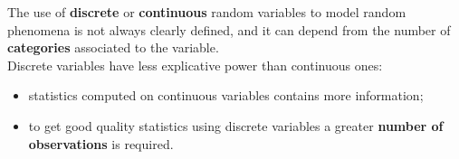 \begin{frame}
  \vspace*{.5cm}
  The use of \textbf{discrete} or \textbf{continuous} random variables to model random phenomena is not always clearly defined, and it can depend from the number of \textbf{categories} associated to the variable.\\
  \vspace*{.75cm}
  Discrete variables have less explicative power than continuous ones:\\
 \begin{itemize}
    \vspace*{.15cm}
    \item statistics computed on continuous variables contains more information;
    \vspace*{.15cm}
    \item to get good quality statistics using discrete variables a greater \textbf{number of observations} is required.
  \end{itemize}
\end{frame}

